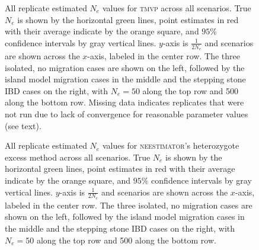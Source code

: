 \begin{landscape}
\begin{figure}[h!]
\centering
{}
\caption[All replicate estimated $N_e$ values for \textsc{tmvp} across all scenarios.]{All replicate estimated $N_e$ values for \textsc{tmvp} across all scenarios. True $N_e$ is shown by the horizontal green lines, point estimates in red with their average indicate by the orange square, and $95\%$ confidence intervals by gray vertical lines. $y$-axis is $\frac{1}{2 N_e}$ and scenarios are shown across the $x$-axis, labeled in the center row. The three isolated, no migration cases are shown on the left, followed by the island model migration cases in the middle and the stepping stone IBD cases on the right, with $N_e = 50$ along the top row and 500 along the bottom row. Missing data indicates replicates that were not run due to lack of convergence for reasonable parameter values (see text).}
\label{fig:supp_tmvp}
\end{figure}


\begin{figure}[h!]
\centering
{}
\caption[All replicate estimated $N_e$ values for \textsc{neestimator}'s heterozygote excess method across all scenarios.]{All replicate estimated $N_e$ values for \textsc{neestimator}'s heterozygote excess method across all scenarios. True $N_e$ is shown by the horizontal green lines, point estimates in red with their average indicate by the orange square, and $95\%$ confidence intervals by gray vertical lines. $y$-axis is $\frac{1}{2 N_e}$ and scenarios are shown across the $x$-axis, labeled in the center row. The three isolated, no migration cases are shown on the left, followed by the island model migration cases in the middle and the stepping stone IBD cases on the right, with $N_e = 50$ along the top row and 500 along the bottom row.}
\label{fig:supp_}
\end{figure}



\end{landscape}
